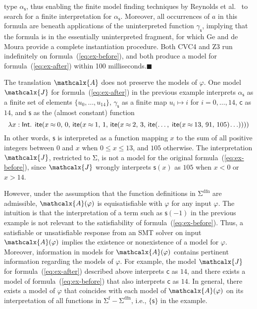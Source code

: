 \documentclass[runningheads,a4paper]{llncs}
\newcommand{\con}[1]{\mathsf{#1}}
\let\const=\con
\let\oldSigma=\Sigma
\def\Sigma{\mathrm{\oldSigma}}
\newcommand\cvc{CVC4\xspace}
\newcommand\ziii{Z3\xspace}
\newcommand{\teq}{\approx}
\newcommand{\I}{\mathcalx{J}} %
\newcommand{\conv}{\mathcalx{A}}
\newcommand{\sfuns}[1]{#1^\mathrm{f}}
\newcommand{\sfundefs}[1]{#1^\mathrm{dfn}}
\newcommand{\sortint}{\ty{Int}}
\newcommand\ty[1]{\con{#1}}
\newcommand{\lite}{\con{ite}}
\newcommand\concret{\gamma} %
\newcommand{\farg}[1]{\concret_{#1}}
\newcommand{\fargsort}[1]{\alpha_{#1}}
\newcommand{\negvthinspace}{\kern-0.083333em}
\newcommand\xend{{\hfill$\scriptstyle\blacksquare$}}
\begin{document}
\begin{example}
type $\fargsort{\con{s}}$, thus enabling the finite model finding
techniques by Reynolds et al.\ \cite{ReyEtAl-1-RR-13,reynolds-et-al-2013} to search for a finite interpretation for
$\fargsort{\con{s}}$. Moreover, all occurrences of $a$ in this formula are beneath
applications of the uninterpreted function $\farg{\con{s}}$, implying that the
formula is in the essentially uninterpreted fragment,
for which Ge and de Moura \cite{GeDeM-CAV-09} provide a complete instantiation
procedure. Both
\cvc and \ziii run indefinitely on formula~(\ref{eq:ex-before}), and both
produce a model for formula~(\ref{eq:ex-after}) within 100 milliseconds.\xend
\end{example}

The translation $\conv$ does not preserve the models of $\varphi$.
One model $\I$ for formula~(\ref{eq:ex-after}) in the previous example interprets
$\fargsort{\con{s}}$ as a finite set of elements $\{ u_0, \ldots, u_{14} \}$,
$\farg{\con{s}}$ as a finite map $u_i \mapsto i$ for $i = 0, \ldots, 14$,
$\con{c}$ as $14$,
and $\con{s}$ as the (almost constant) function
%
\begin{equation} \label{eq:approx-interp}
\lambda x : \sortint.\;\, \lite( x \mathbin{\teq} 0,\, 0,\,
  \lite( x \mathbin{\teq} 1,\, 1,\,
    \lite( x \mathbin{\teq} 2,\, 3,\,
      \lite(\ldots,\; \lite( x \mathbin{\teq} 13,\, 91,\, 105 )\negvthinspace \ldots ))))
\end{equation}
%
In other words, $\const{s}$ is interpreted as a function mapping $x$ to the sum
of all positive integers between $0$ and $x$ when $0 \leq x \leq 13$, and $105$
otherwise.
The interpretation $\I$, restricted to $\Sigma$, is {not} a model for the original formula~(\ref{eq:ex-before}),
since $\I$ wrongly interprets $\con{s}( x )$ as $105$ when $x < 0$ or $x > 14$.

However, under the assumption that the function definitions in
$\sfundefs{\Sigma}$ are admissible, %
$\conv(\varphi)$ is
equisatisfiable with $\varphi$ for any input $\varphi$. The intuition is that the
interpretation of a term such as $\con{s}( -1 )$ in the previous example is not
relevant to the satisfiability of formula~(\ref{eq:ex-before}). Thus, a
satisfiable or unsatisfiable response from an SMT solver on input $\conv(
\varphi )$ implies the existence or nonexistence of a model for
$\varphi$. Moreover, information in models for $\conv( \varphi )$ contains
pertinent information regarding the models of $\varphi$. For example, the model
$\I$ for formula~(\ref{eq:ex-after}) described above interprets $\con{c}$ as $14$,
and there exists a model of formula~(\ref{eq:ex-before}) that also interprets $\con{c}$
as $14$. In general, there exists a model of $\varphi$ that
coincides with each model of $\conv( \varphi )$ on its interpretation of all
functions in $\sfuns{\Sigma} - \sfundefs{\Sigma}$, i.e., $\{
\con{s} \}$ in the example.
\end{document}
